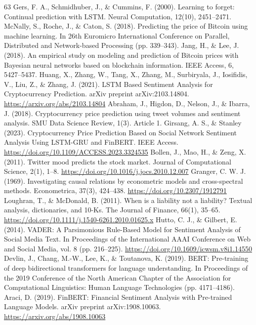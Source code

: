 \begin{thebibliography}{63}
     Gers, F. A., Schmidhuber, J., \& Cummins, F. (2000). Learning to forget: Continual prediction with LSTM. Neural Computation, 12(10), 2451--2471.
     McNally, S., Roche, J., \& Caton, S. (2018). Predicting the price of Bitcoin using machine learning. In 26th Euromicro International Conference on Parallel, Distributed and Network-based Processing (pp. 339--343).
     Jang, H., \& Lee, J. (2018). An empirical study on modeling and prediction of Bitcoin prices with Bayesian neural networks based on blockchain information. IEEE Access, 6, 5427--5437.
     Huang, X., Zhang, W., Tang, X., Zhang, M., Surbiryala, J., Iosifidis, V., Liu, Z., \& Zhang, J. (2021). LSTM Based Sentiment Analysis for Cryptocurrency Prediction. arXiv preprint arXiv:2103.14804. \url{https://arxiv.org/abs/2103.14804}
     Abraham, J., Higdon, D., Nelson, J., \& Ibarra, J. (2018). Cryptocurrency price prediction using tweet volumes and sentiment analysis. SMU Data Science Review, 1(3). Article 1.
     Girsang, A. S., \& Stanley (2023). Cryptocurrency Price Prediction Based on Social Network Sentiment Analysis Using LSTM-GRU and FinBERT. IEEE Access. \url{https://doi.org/10.1109/ACCESS.2023.3324535}
     Bollen, J., Mao, H., \& Zeng, X. (2011). Twitter mood predicts the stock market. Journal of Computational Science, 2(1), 1--8. \url{https://doi.org/10.1016/j.jocs.2010.12.007}
     Granger, C. W. J. (1969). Investigating causal relations by econometric models and cross-spectral methods. Econometrica, 37(3), 424--438. \url{https://doi.org/10.2307/1912791}
     Loughran, T., \& McDonald, B. (2011). When is a liability not a liability? Textual analysis, dictionaries, and 10-Ks. The Journal of Finance, 66(1), 35--65. \url{https://doi.org/10.1111/j.1540-6261.2010.01625.x}
     Hutto, C. J., \& Gilbert, E. (2014). VADER: A Parsimonious Rule-Based Model for Sentiment Analysis of Social Media Text. In Proceedings of the International AAAI Conference on Web and Social Media, vol. 8 (pp. 216--225). \url{https://doi.org/10.1609/icwsm.v8i1.14550}
     Devlin, J., Chang, M.-W., Lee, K., \& Toutanova, K. (2019). BERT: Pre-training of deep bidirectional transformers for language understanding. In Proceedings of the 2019 Conference of the North American Chapter of the Association for Computational Linguistics: Human Language Technologies (pp. 4171--4186).
     Araci, D. (2019). FinBERT: Financial Sentiment Analysis with Pre-trained Language Models. arXiv preprint arXiv:1908.10063. \url{https://arxiv.org/abs/1908.10063}

\end{thebibliography}
